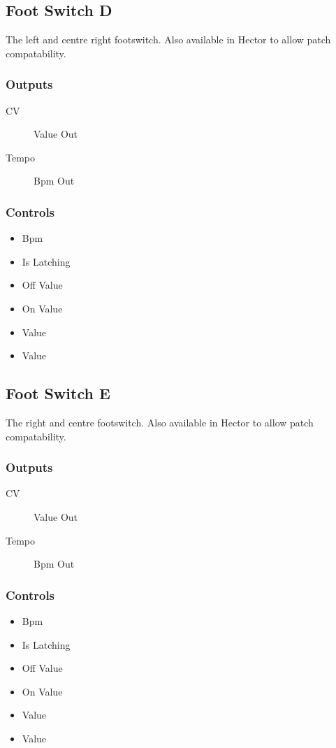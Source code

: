 \subsection{Foot Switch D}

The left and centre right footswitch. Also available in Hector to allow patch compatability.



\subsubsection{Outputs}
\begin{description}
\item [CV] Value Out
\item [Tempo] Bpm Out
\end{description}

\subsubsection{Controls}
\begin{itemize}
\item Bpm
\item Is Latching
\item Off Value
\item On Value
\item Value
\item Value
\end{itemize}

\subsection{Foot Switch E}

The right and centre footswitch. Also available in Hector to allow patch compatability.



\subsubsection{Outputs}
\begin{description}
\item [CV] Value Out
\item [Tempo] Bpm Out
\end{description}

\subsubsection{Controls}
\begin{itemize}
\item Bpm
\item Is Latching
\item Off Value
\item On Value
\item Value
\item Value
\end{itemize}


